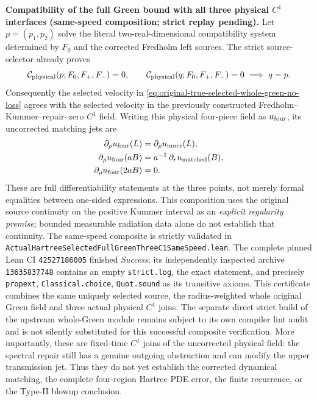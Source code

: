 \documentclass[11pt]{amsart}
\begin{document}
\medskip
\noindent\textbf{Compatibility of the full Green bound with all three
physical $C^1$ interfaces (same-speed composition; strict replay pending).}
Let $p=(p_1,p_2)$ solve the literal two-real-dimensional compatibility
system determined by $F_0$ and the corrected Fredholm left sources.
The strict source-selector already proves
\[
  \mathcal C_{\rm physical}(p;F_0,F_+,F_-)=0,
  \qquad
  \mathcal C_{\rm physical}(q;F_0,F_+,F_-)=0
       \ \Longrightarrow\ q=p.
\]
Consequently the selected velocity in
\eqref{eq:original-true-selected-whole-green-no-loss}
agrees with the selected velocity in the previously constructed
Fredholm--Kummer--repair--zero $C^1$ field. Writing this physical
four-piece field as $u_{\rm four}$, its uncorrected matching jets are
\[
 \begin{aligned}
  \partial_\rho u_{\rm four}(L)
     &=\partial_\rho u_{\rm inner}(L),\\
  \partial_\rho u_{\rm four}(aB)
     &=a^{-1}\,\partial_r u_{\rm matched}(B),\\
  \partial_\rho u_{\rm four}(2aB)&=0.
 \end{aligned}
\]
These are full differentiability statements at the three points, not
merely formal equalities between one-sided expressions.  This
composition uses the original source continuity on the positive
Kummer interval as an \emph{explicit regularity premise}; bounded
measurable radiation data alone do not establish that continuity.
The same-speed composite is strictly validated in
\texttt{ActualHartreeSelectedFullGreenThreeC1SameSpeed.lean}.
The complete pinned Lean CI \texttt{42527186005} finished
\emph{Success}; its independently inspected archive
\texttt{13635837748} contains an empty \texttt{strict.log},
the exact statement, and precisely
\texttt{propext}, \texttt{Classical.choice}, \texttt{Quot.sound}
as its transitive axioms. This certificate combines the same uniquely
selected source, the radius-weighted whole original Green field and
three actual physical $C^1$ joins. The separate direct strict build
of the upstream whole-Green module remains subject to its own compiler
lint audit and is not silently substituted for this successful
composite verification.  More importantly, these are fixed-time
$C^1$ joins of the uncorrected physical field: the spectral repair
still has a genuine outgoing obstruction and can modify the upper
transmission jet. Thus they do not yet establish the corrected
dynamical matching, the complete four-region Hartree PDE error,
the finite recurrence, or the Type-II blowup conclusion.
\end{document}

